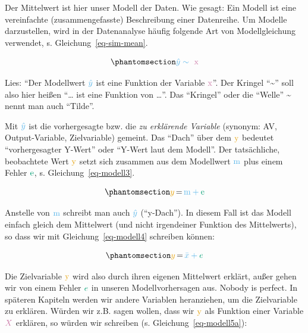 \documentclass[
  letterpaper,
  oneside,
  open=any]{scrbook}
\theoremstyle{definition}
\theoremstyle{definition}
\theoremstyle{definition}
\theoremstyle{remark}
\begin{document}
Der Mittelwert ist hier unser Modell der Daten. Wie gesagt: Ein Modell
ist eine vereinfachte (zusammengefasste) Beschreibung einer Datenreihe.
Um Modelle darzustellen, wird in der Datenanalyse häufig folgende Art
von Modellgleichung verwendet, s. Gleichung~\ref{eq-sim-mean}.

\begin{equation}\phantomsection\label{eq-sim-mean}{\color{modelcol}{\hat{y}} \sim \color{xcol}{\text{ x}}}\end{equation}

Lies: \enquote{Der Modellwert \(\color{modelcol}{\hat{y}}\) ist eine
Funktion der Variable \(\color{xcol}{\text{x}}\)}. Der Kringel
\enquote{\textasciitilde{}} soll also hier heißen \enquote{\ldots{} ist
eine Funktion von \ldots{}}. Das \enquote{Kringel} oder die
\enquote{Welle} \textasciitilde{} nennt man auch \enquote{Tilde}.

Mit \(\color{modelcol}{\hat{y}}\) ist die vorhergesagte bzw. die
\emph{zu erklärende Variable} (synonym: AV, Output-Variable,
Zielvariable) gemeint. Das \enquote{Dach} über dem
\(\color{ycol}{\text{y}}\) bedeutet \enquote{vorhergesagter Y-Wert} oder
\enquote{Y-Wert laut dem Modell}. Der tatsächliche, beobachtete Wert
\(\color{ycol}{\text{y}}\) setzt sich zusammen aus dem Modellwert
\(\color{modelcol}{\text{m}}\) plus einem Fehler
\(\color{errorcol}{\text{e}}\), s. Gleichung~\ref{eq-modell3}.

\begin{equation}\phantomsection\label{eq-modell3}{\color{ycol}{y} \color{black}{\, = \,} \color{modelcol}{\text{m}} + \color{errorcol}{\text{e}}}\end{equation}

Anstelle von \(\color{modelcol}{\text{m}}\) schreibt man auch
\(\color{modelcol}{\hat{y}}\) (\enquote{y-Dach}). In diesem Fall ist das
Modell einfach gleich dem Mittelwert (und nicht irgendeiner Funktion des
Mittelwerts), so dass wir mit Gleichung~\ref{eq-modell4} schreiben
können:

\begin{equation}\phantomsection\label{eq-modell4}{\color{ycol}{y}  \color{black}{\, =\, } \color{modelcol}{\bar{x}} + \color{errorcol}{e}}\end{equation}

Die Zielvariable \(\color{ycol}{\text{y}}\) wird also durch ihren
eigenen Mittelwert erklärt, außer gehen wir von einem Fehler
\(\color{errorcol}e\) in unseren Modellvorhersagen aus. Nobody is
perfect. In späteren Kapiteln werden wir andere Variablen heranziehen,
um die Zielvariable zu erklären. Würden wir z.B. sagen wollen, dass wir
\(\color{ycol}{\text{y}}\) als Funktion einer Variable
\(\color{xcol}{X}\) erklären, so würden wir schreiben (s.
Gleichung~\ref{eq-modell5a}):
\end{document}
